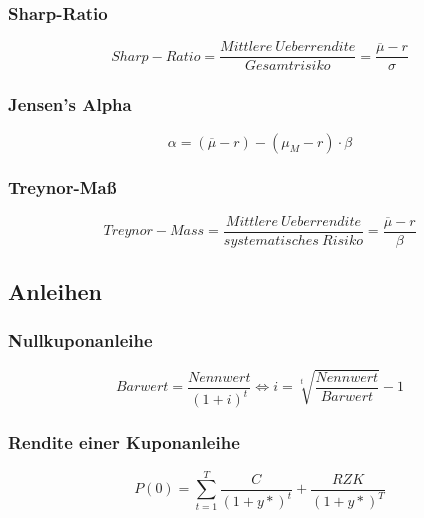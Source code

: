 \subsubsection{Sharp-Ratio}
\[Sharp-Ratio = \frac{Mittlere~Ueberrendite}{Gesamtrisiko} = \frac{\overline{\mu} - r}{\sigma}\]

\subsubsection{Jensen's Alpha}
\[\alpha = (\overline{\mu} - r) - (\mu_M - r) \cdot \beta\]

\subsubsection{Treynor-Maß}
\[Treynor-Mass = \frac{Mittlere~Ueberrendite}{systematisches~Risiko} = \frac{\overline{\mu} - r}{\beta}\]

\subsection{Anleihen}

\subsubsection{Nullkuponanleihe}
\[Barwert = \frac{Nennwert}{(1+i)^t} \iff i = \sqrt[t]{\frac{Nennwert}{Barwert}} -1\]

\subsubsection{Rendite einer Kuponanleihe}
\[P(0) = \sum_{t=1}^{T} \frac{C}{(1+y*)^t} + \frac{RZK}{(1+y*)^T}\]
